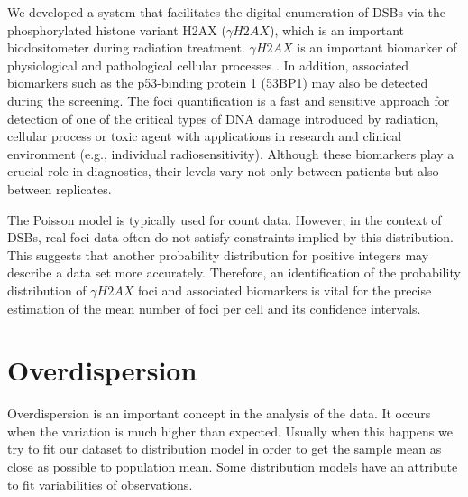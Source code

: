 We developed a system that facilitates the digital  enumeration of DSBs via the phosphorylated histone  variant H2AX ($\gamma H2AX$), which is an important  biodositometer during radiation treatment. $\gamma H2AX$ is an important biomarker of physiological and pathological cellular processes \cite{reddig_dna_2018,rodiger_quantification_2018}. In addition, associated biomarkers such as the p53-binding protein 1 (53BP1) may also be detected during the screening. The foci quantification is a fast and sensitive approach for detection of one of the critical types of DNA damage introduced by radiation, cellular process or toxic agent with applications in research and clinical environment (e.g., individual radiosensitivity). Although these biomarkers play a crucial role in diagnostics, their levels vary not only between patients but also between replicates.

The Poisson model is typically used for count data. However, in the context of DSBs, real foci data often do not satisfy constraints implied by this distribution. This suggests that another probability distribution for positive integers may describe a data set more accurately. Therefore, an identification of the probability distribution of $\gamma H2AX$ foci and associated biomarkers is vital for the precise estimation of the mean number of foci per cell and its confidence intervals.


\section{Overdispersion}

Overdispersion is an important concept in the analysis of the data. It occurs when the variation is much higher than expected. Usually when this happens we try to fit our dataset to distribution model in order to get the sample mean as close as possible to population mean. Some distribution models have an attribute to fit variabilities of observations.


